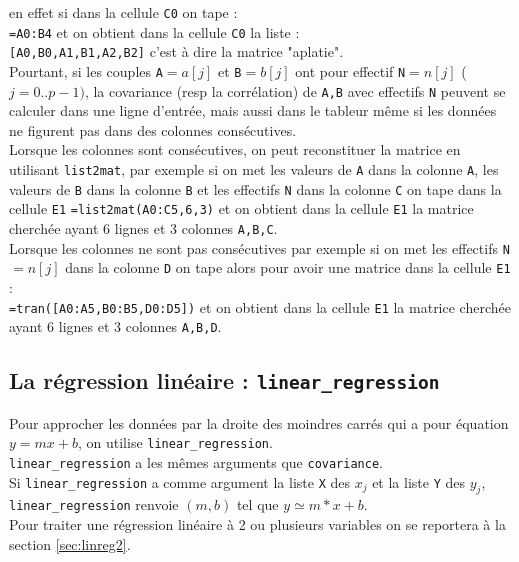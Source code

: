 \documentclass[a4paper,11pt]{book}
\begin{document}
en effet si dans la cellule {\tt C0} on tape :\\
{\tt =A0:B4} et on obtient dans la cellule {\tt C0} la liste :\\
{\tt [A0,B0,A1,B1,A2,B2]} c'est \`a dire la matrice "aplatie".\\
Pourtant, si les couples {\tt A}$=a[j]$ et {\tt B}$=b[j]$ ont pour 
effectif {\tt N}$=n[j]$ ($j=0..p-1)$,
la covariance (resp la corr\'elation) de {\tt A,B} avec effectifs {\tt N} 
peuvent se calculer dans une ligne d'entr\'ee, mais aussi dans le tableur 
m\^eme si 
les donn\'ees ne figurent pas dans des colonnes cons\'ecutives.\\
Lorsque les colonnes sont cons\'ecutives, on peut 
reconstituer la matrice en utilisant {\tt list2mat}, par exemple si on met 
les valeurs de {\tt A} dans la colonne {\tt A}, les valeurs de {\tt B}
dans la colonne {\tt B} et les
effectifs {\tt N} dans la colonne {\tt C} on tape dans la cellule 
{\tt E1} {\tt =list2mat(A0:C5,6,3)} et on obtient dans la cellule {\tt E1} la 
matrice cherch\'ee ayant 6 lignes et 3 colonnes {\tt A,B,C}.\\
Lorsque les colonnes ne sont pas cons\'ecutives par exemple si on met les 
effectifs {\tt N}$=n[j]$ dans la colonne {\tt D}  on 
tape alors pour avoir une matrice dans la cellule {\tt E1} :\\
{\tt =tran([A0:A5,B0:B5,D0:D5])}  et on obtient dans la cellule {\tt E1} la 
matrice cherch\'ee ayant 6 lignes et 3 colonnes {\tt A,B,D}.

\subsection{La r\'egression lin\'eaire : {\tt linear\_regression}}\label{sec:linreg}
Pour approcher les donn\'ees par la droite des moindres carr\'es qui a pour 
\'equation $y=mx+b$, on utilise  {\tt linear\_regression}.\\
{\tt linear\_regression} a les m\^emes arguments que {\tt covariance}.\\
Si {\tt linear\_regression} a comme argument la liste {\tt X} des $x_j$ et la 
liste {\tt Y} des $y_j$, {\tt linear\_regression} renvoie $(m, b)$ tel que 
$y \simeq m*x+b$.\\
Pour traiter une r\'egression lin\'eaire \`a 2 ou plusieurs variables on se 
reportera \`a la section  \ref{sec:linreg2}.
\end{document}
